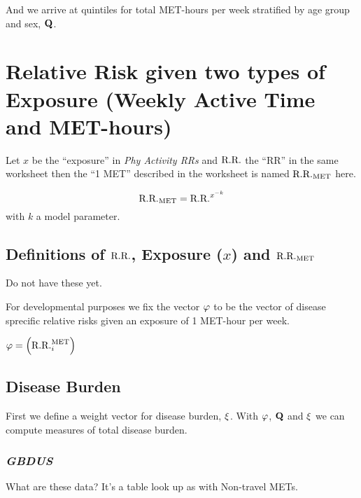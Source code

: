 And we arrive at quintiles for total MET-hours per week stratified by age group and sex, $\mathbf{Q}$.



\section{Relative Risk given two types of Exposure (Weekly Active Time and MET-hours)}


Let $x$ be the ``exposure'' in \textit{Phy Activity RRs} and $\textrm{R.R.}$ the ``RR'' in the same worksheet then the ``1 MET'' described in the worksheet is named $\textrm{R.R.}_{\scriptsize{\textrm{MET}}}$ here.

$$\textrm{R.R.}_{\scriptsize{\textrm{MET}}} = {\textrm{R.R.}}^{{x^{-k}}}$$ with $k$ a model parameter.

\subsection{Definitions of $\textrm{R.R.}$, Exposure ($x$) and $\textrm{R.R.}_{\scriptsize{\textrm{MET}}}$}

Do not have these yet.

For developmental purposes we fix the vector $\mathbf{\varphi}$ to be
the vector of disease sprecific relative risks given an exposure of 1
MET-hour per week.

$\mathbf{\varphi} = \left( \textrm{R.R.}_i^{\scriptsize{\textrm{MET}}} \right)$

\subsection{Disease Burden}

First we define a weight vector for disease burden, $\mathbf{\xi}$. With
$\mathbf{\varphi}$, $\mathbf{Q}$ and $\mathbf{\xi}$ we can compute measures of
total disease burden.

\subsubsection{\textit{GBDUS}}

What are these data?  It's a table look up as with Non-travel METs.
